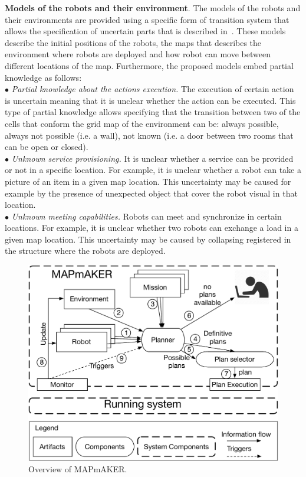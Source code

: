 \textbf{Models of the robots and their environment}. 
The models of the robots and their environments are provided using a specific form of transition system that allows the specification of uncertain parts that is described  in~\cite{mapmaker17}.
These models describe the initial positions of the robots, the maps that describes the environment where robots are deployed and how robot can move between different locations of the map. 
Furthermore, the proposed models embed partial knowledge as follows:\\
$\bullet$  \emph{Partial knowledge about the actions execution.} 
The execution of certain action is uncertain meaning that it is unclear whether the action can be executed.
This type of partial knowledge allows specifying that the transition between two of the cells that conform the grid map of the environment can be:
always possible, always not possible (i.e. a wall), not known (i.e. a door between two rooms that can be open or closed).\\
$\bullet$ \emph{Unknown service provisioning.} 
It is unclear  whether a service can be provided or not in a specific location. 
For example, it is unclear whether a robot can take a picture of an item in a given map location.
This  uncertainty may be caused for example by the presence of unexpected object that cover the robot visual in that location.\\
$\bullet$ \emph{Unknown meeting capabilities.} Robots can meet and synchronize in certain locations.
For example, it is unclear whether two robots can exchange a load in a given map location.
This uncertainty may be caused by collapsing registered in the structure where the robots are deployed.


\begin{figure}[t]
\begin{center}
\includegraphics[width=1\linewidth]{Figures/MAPmAKER.pdf}
\caption{Overview of  MAPmAKER.}
\label{fig:overview}
\end{center}
\end{figure}




